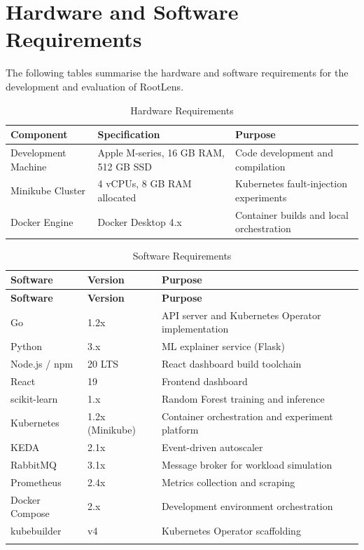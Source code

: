 \section{Hardware and Software Requirements}
The following tables summarise the hardware and software requirements for the development and evaluation of RootLens.

\begin{table}[H]
\centering
\begin{tabularx}{\textwidth}{|l|X|X|}
\hline
\textbf{Component} & \textbf{Specification} & \textbf{Purpose} \\ \hline
Development Machine & Apple M-series, 16 GB RAM, 512 GB SSD & Code development and compilation \\ \hline
Minikube Cluster & 4 vCPUs, 8 GB RAM allocated & Kubernetes fault-injection experiments \\ \hline
Docker Engine & Docker Desktop 4.x & Container builds and local orchestration \\ \hline
\end{tabularx}
\caption{Hardware Requirements}
\label{tab:hardware_req}
\end{table}

\begin{xltabular}{\textwidth}{|p{3.5cm}|p{3.5cm}|X|}

\hline
\textbf{Software} & \textbf{Version} & \textbf{Purpose} \\ \hline
\endfirsthead

\hline
\textbf{Software} & \textbf{Version} & \textbf{Purpose} \\ \hline
\endhead

Go & 1.2x & API server and Kubernetes Operator implementation \\ \hline
Python & 3.x & ML explainer service (Flask) \\ \hline
Node.js / npm & 20 LTS & React dashboard build toolchain \\ \hline
React & 19 & Frontend dashboard \\ \hline
scikit-learn & 1.x & Random Forest training and inference \\ \hline
Kubernetes & 1.2x (Minikube) & Container orchestration and experiment platform \\ \hline
KEDA & 2.1x & Event-driven autoscaler \\ \hline
RabbitMQ & 3.1x & Message broker for workload simulation \\ \hline
Prometheus & 2.4x & Metrics collection and scraping \\ \hline
Docker Compose & 2.x & Development environment orchestration \\ \hline
kubebuilder & v4 & Kubernetes Operator scaffolding \\ \hline

\caption{Software Requirements}
\label{tab:software_req}
\end{xltabular}

